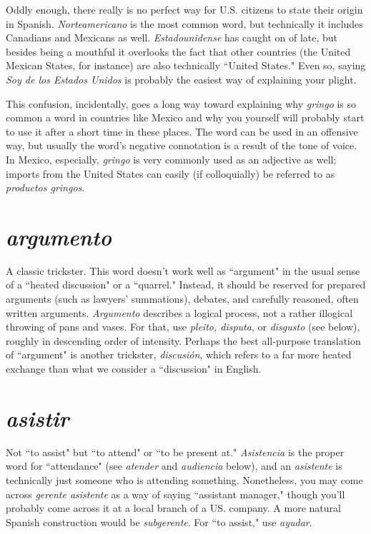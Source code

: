Oddly enough, there really is no perfect way for U.S. citizens
to state their origin in Spanish. \emph{Norteamericano} is the most common
word, but technically it includes Canadians and Mexicans as well. \emph{Estadounidense} has caught on of late, but besides being a mouthful it
overlooks the fact that other countries (the United Mexican States, for
instance) are also technically ``United States." Even so, saying \emph{Soy de
	los Estados Unidos} is probably the easiest way of explaining your
plight.

This confusion, incidentally, goes a long way toward explaining why \emph{gringo} is so common a word in countries like Mexico and why
you yourself will probably start to use it after a short time in these
places. The word can be used in an offensive way, but usually the
word's negative connotation is a result of the tone of voice. In Mexico,
especially, \emph{gringo} is very commonly used as an adjective as well; imports from the United States can easily (if colloquially) be referred to
as \emph{productos gringos}.

\section{\emph{argumento}}

A classic trickster. This word doesn't work
well as ``argument" in the usual sense of a ``heated discussion" or a
``quarrel." Instead, it should be reserved for prepared arguments (such
as lawyers' summations), debates, and carefully reasoned, often written
arguments. \emph{Argumento} describes a logical process, not a rather illogical throwing of pans and vases. For that, use \emph{pleito, disputa}, or \emph{disgusto} (see below), roughly in descending order of intensity. Perhaps the
best all-purpose translation of ``argument" is another trickster, \emph{discusión}, which refers to a far more heated exchange than what we consider a ``discussion" in English.

\section{\emph{asistir}}

Not ``to assist" but ``to attend" or ``to be present at."
\emph{Asistencia} is the proper word for ``attendance" (see \emph{atender} and \emph{audiencia} below), and an \emph{asistente} is technically just someone who is attending something. Nonetheless, you may come across \emph{gerente asistente} as a way of saying ``assistant manager," though you'll probably
come across it at a local branch of a US. company. A more natural
Spanish construction would be \emph{subgerente}. For ``to assist," use \emph{ayudar}.

